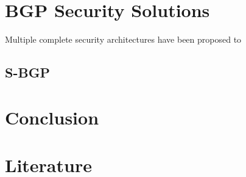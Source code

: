\documentclass[12pt]{IEEEtran}
\begin{document}
	
	
			
				

	\section{BGP Security Solutions}
	Multiple complete security architectures have been proposed to 
	\subsection{S-BGP}
				
	\section{Conclusion}				

	
	\section{Literature}
\end{document}
